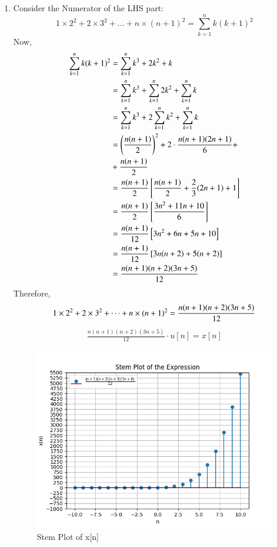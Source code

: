 \documentclass[journal,12pt,twocolumn]{IEEEtran}
\theoremstyle{remark}
\begin{document}
\begin{enumerate}[label=\alph*)]
\item Consider the Numerator of the LHS part:
\begin{equation}
    1\times2^2 + 2\times3^2 + \dots + n\times(n+1)^2 = \sum_{k=1}^n k(k+1)^2 
\end{equation}
Now,
\begin{align}
    \sum_{k=1}^n k(k+1)^2 &= \sum_{k=1}^n k^3+2k^2+k\\
                          &=  \sum_{k=1}^n k^3 + \sum_{k=1}^n 2k^2 + \sum_{k=1}^n k\\
                          &=  \sum_{k=1}^n k^3 + 2\sum_{k=1}^n k^2 + \sum_{k=1}^n k\\
                          &= \left(\frac{n(n+1)}{2}\right)^{\scriptstyle 2} + 2\cdot \frac{n(n+1)(2n+1)}{6}+\\  &+\frac{n(n+1)}{2}\notag \\
                          &= \frac{n(n+1)}{2}\left[\frac{n(n+1)}{2} + \frac{2}{3}(2n+1) + 1\right]\\
                          &= \frac{n(n+1)}{2}\left[\frac{3n^2 + 11n +10}{6}\right]\\
                          &= \frac{n(n+1)}{12}\left[3n^2 + 6n + 5n + 10\right]\\
                          &= \frac{n(n+1)}{12}\left[3n(n+2)+5(n+2)\right]\\
                          &= \frac{n(n+1)(n+2)(3n+5)}{12}
\end{align}
Therefore,
\begin{equation}
   1\times2^2 + 2\times3^2 + \dots + n\times(n+1)^2 = \frac{n(n+1)(n+2)(3n+5)}{12}   \\
\end{equation}
\begin{align}
    \frac{n(n+1)(n+2)(3n+5)}{12}\cdot u[n] = x[n]
\end{align}
\begin{figure}[h]
        \includegraphics[width=\columnwidth]{Figure_1.png}
        \caption{Stem Plot of x[n]}
    \end{figure}
    

\end{enumerate}
\end{document}

